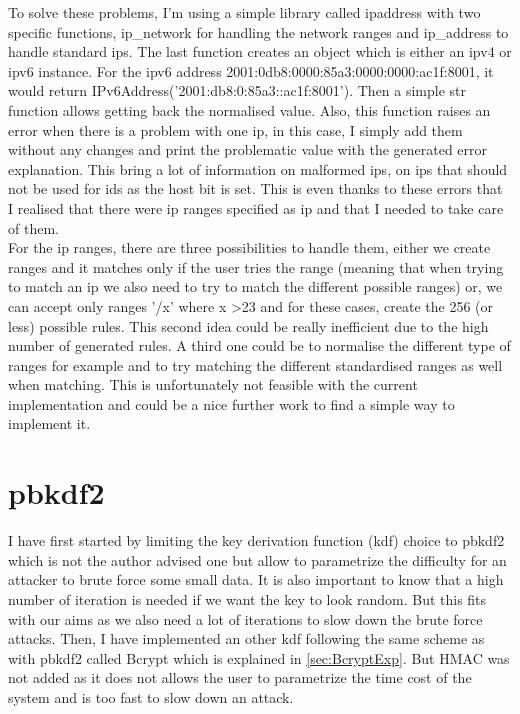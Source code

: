 \documentclass{eplmastersthesis}
\begin{document}
To solve these problems, I'm using a simple library called ipaddress with two specific functions, ip\_network for handling the network ranges and ip\_address to handle standard \glspl{ip}.
The last function creates an object which is either an \gls{ipv4} or \gls{ipv6} instance. For the \gls{ipv6} address 2001:0db8:0000:85a3:0000:0000:ac1f:8001, it would return IPv6Address('2001:db8:0:85a3::ac1f:8001'). Then a simple str function allows getting back the normalised value.
Also, this function raises  an error when there is a problem with one \gls{ip}, in this case, I simply add them without any changes and print the problematic value with the generated error explanation. This bring a lot of information on malformed \glspl{ip}, on \glspl{ip} that should not be used for \gls{ids} as the host bit is set. This is even thanks to these errors that I realised that there were \gls{ip} ranges specified as \gls{ip} and that I needed to take care of them.\\

For the \gls{ip} ranges, there are three possibilities to handle them, either we create ranges and it matches only if the user tries the range (meaning that when trying to match an \gls{ip} we also need to try to match the different possible ranges) or, we can accept only ranges '/x' where x >23 and for these cases, create the 256 (or less) possible rules. This second idea could be really inefficient due to the high number of generated rules. A third one could be to normalise the different type of ranges for example and to try matching the different standardised ranges as well when matching. This is unfortunately not feasible with the current implementation and could be a nice further work to find a simple way to implement it.


\section{\gls{pbkdf2}}
I have first started by limiting the key derivation function (\gls{kdf}) choice to \gls{pbkdf2} which is not the author advised one but allow to parametrize the difficulty for an attacker to brute force some small data. It is also important to know that a high number of iteration is needed if we want the key to look random. But this fits with our aims as we also need a lot of iterations to slow down the brute force attacks.
Then, I have implemented an other \gls{kdf} following the same scheme as with \gls{pbkdf2} called Bcrypt which is explained in \ref{sec:BcryptExp}. 
But HMAC was not added as it does not allows the user to parametrize the time cost of the system and is too fast to slow down an attack.
\end{document}
